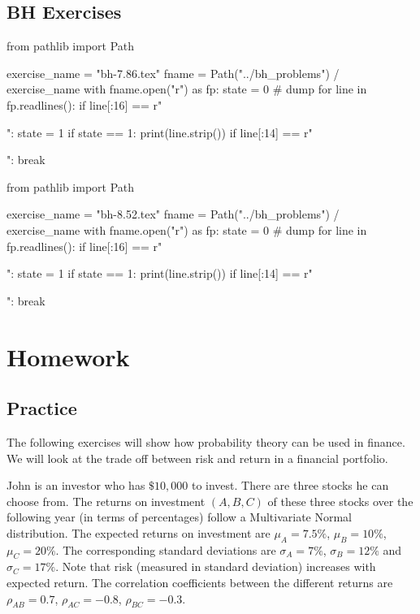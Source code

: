 \subsection{BH Exercises}


\begin{pycode}
from pathlib import Path

exercise_name = "bh-7.86.tex"
fname = Path("../bh_problems") / exercise_name
with fname.open("r") as fp:
    state = 0  # dump
    for line in fp.readlines():
        if line[:16] == r"\begin{exercise}":
            state = 1
        if state == 1:
            print(line.strip())
        if line[:14] == r"\end{exercise}":
            break
\end{pycode}



\begin{pycode}
from pathlib import Path

exercise_name = "bh-8.52.tex"
fname = Path("../bh_problems") / exercise_name
with fname.open("r") as fp:
    state = 0  # dump
    for line in fp.readlines():
        if line[:16] == r"\begin{exercise}":
            state = 1
        if state == 1:
            print(line.strip())
        if line[:14] == r"\end{exercise}":
            break
\end{pycode}

\section{Homework}
\label{sec:homework}

\subsection{Practice}
\label{sec:practice}


The following exercises will show how probability theory can be used in finance. We will look at the trade off between risk and return in a financial portfolio.

John is an investor who has $\$ 10,000$ to invest.
There are three stocks he can choose from.
The returns on investment $(A,B,C)$ of these three stocks over the following year (in terms of percentages) follow a Multivariate Normal distribution.
The expected returns on investment are $\mu_A = 7.5 \%$, $\mu_B = 10\%$, $\mu_C = 20\%$.
The corresponding standard deviations are $\sigma_A = 7\%$, $\sigma_B = 12 \%$ and $\sigma_C = 17\%$.
Note that risk (measured in standard deviation) increases with expected return.
The correlation coefficients between the different returns are $\rho_{AB} = 0.7$, $\rho_{AC} = -0.8$, $\rho_{BC} = -0.3$.

